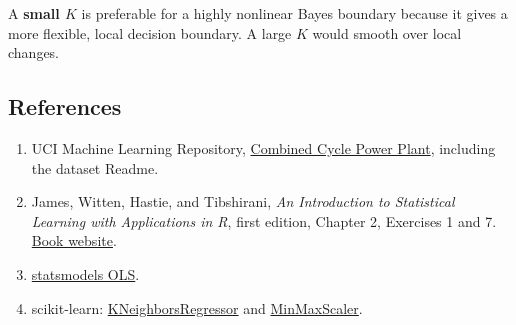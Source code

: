 \documentclass[11pt]{article}
\providecommand{\tightlist}{%
      \setlength{\itemsep}{0pt}\setlength{\parskip}{0pt}}
\begin{document}
A \textbf{small \(K\)} is preferable for a highly nonlinear Bayes
boundary because it gives a more flexible, local decision boundary. A
large \(K\) would smooth over local changes.

    \hypertarget{references}{%
\subsection{References}\label{references}}

\begin{enumerate}
\def\labelenumi{\arabic{enumi}.}
\tightlist
\item
  UCI Machine Learning Repository,
  \href{https://archive.ics.uci.edu/dataset/294/combined+cycle+power+plant}{Combined
  Cycle Power Plant}, including the dataset Readme.
\item
  James, Witten, Hastie, and Tibshirani, \emph{An Introduction to
  Statistical Learning with Applications in R}, first edition, Chapter
  2, Exercises 1 and 7. \href{https://www.statlearning.com/}{Book
  website}.
\item
  \href{https://www.statsmodels.org/stable/generated/statsmodels.regression.linear_model.OLS.html}{statsmodels
  OLS}.
\item
  scikit-learn:
  \href{https://scikit-learn.org/stable/modules/generated/sklearn.neighbors.KNeighborsRegressor.html}{KNeighborsRegressor}
  and
  \href{https://scikit-learn.org/stable/modules/generated/sklearn.preprocessing.MinMaxScaler.html}{MinMaxScaler}.
\end{enumerate}


    
    
    
\end{document}
